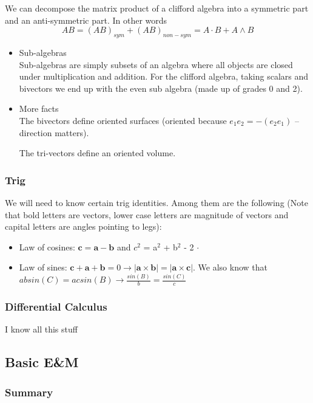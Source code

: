 \documentclass[11pt]{article}
\begin{document}
We can decompose the matrix product of a clifford algebra into a symmetric part
and an anti-symmetric part. In other words $$AB = (AB)_{sym} + (AB)_{non-sym} =
A \cdot B + A \wedge B$$
\begin{itemize}

\item Sub-algebras\\
\label{sec-2-2-2-1}%
Sub-algebras are simply subsets of an algebra where all objects are closed
under multiplication and addition. For the clifford algebra, taking scalars and
bivectors we end up with the even sub algebra (made up of grades 0 and 2).


\item More facts\\
\label{sec-2-2-2-2}%
The bivectors define oriented surfaces (oriented because $e_1 e_2 = - (e_2
e_1)$ -- direction matters).

The tri-vectors define an oriented volume.

\end{itemize} %
\subsubsection{Trig}
\label{sec-2-2-3}

We will need to know certain trig identities. Among them are the following
(Note that bold letters are vectors, lower case letters are magnitude of
vectors and capital letters are angles pointing to legs):
\begin{itemize}
\item Law of cosines: $\bm{c} = \bm{a} - \bm{b}$ and $c^2$ =
  a$^2$ + b$^2$ - 2  $\cdot$ 
\item Law of sines: $\bm{c} + \bm{a} + \bm{b} = 0
  \rightarrow |\bm{a} \times \bm{b}| = |\bm{a} \times
  \bm{c}|$. We also know that $ab sin(C) = ac sin(B) \rightarrow
  \frac{sin(B)}{b} = \frac{sin(C)}{c}$
\end{itemize}
\subsubsection{Differential Calculus}
\label{sec-2-2-4}

    I know all this stuff
\subsection{Basic E\&M}
\label{sec-2-3}
\subsubsection{Summary}
\label{sec-2-3-1}
\end{document}
